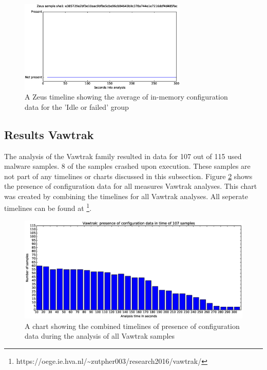 \documentclass[conference]{IEEEtran}
\begin{document}
\begin{figure}[!h]
    \includegraphics[width=8cm,scale=0.5]{images/zeus/zeus-timelines-eps/Zeus-e385729e2bf3e10aac9bf0a5cbe96cb84643b0c378a744e1e7216ddf4d485fac.eps}
    \caption{A Zeus timeline showing the average of in-memory configuration data for the 'Idle or failed' group}
    \label{fig:zeus-timeline-idle}
\end{figure}

\newpage

\subsection{Results Vawtrak}
The analysis of the Vawtrak family resulted in data for 107 out of 115 used malware samples. 8 of the samples crashed upon execution. These samples are not part of any timelines or charts discussed in this subsection. Figure \ref{fig:vawtrak-bar} shows the presence of configuration data for all measures Vawtrak analyses. This chart was created by combining the timelines for all Vawtrak analyses. All seperate timelines can be found at \footnote{https://oege.ie.hva.nl/\textasciitilde{}zutpher003/research2016/vawtrak/}.


\begin{figure}[h]
	\hspace{-3cm}
    \includegraphics[width=13cm,trim=-70mm 0mm 0mm 9mm, clip=true]{images/vawtrak/Vawtrak-barchart.eps}
    \caption{A chart showing the combined timelines of presence of configuration data during the analysis of all Vawtrak samples}
    \label{fig:vawtrak-bar}
\end{figure}
\end{document}
